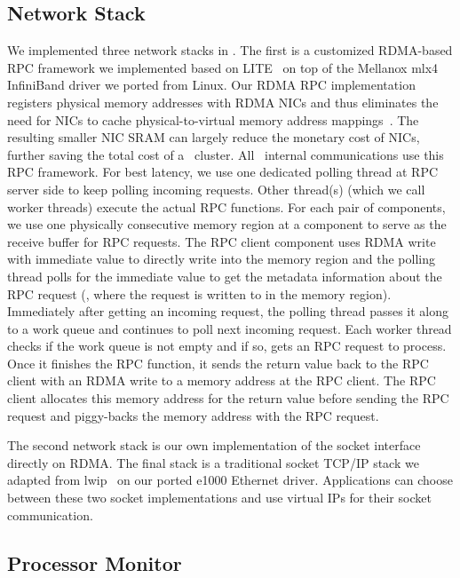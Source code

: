 \documentclass[10pt,times,twocolumn]{z2-article}
\begin{document}
{{{{{{{\subsection{Network Stack}
We implemented three network stacks in \lego.
The first is a customized RDMA-based RPC framework we implemented based on LITE~\cite{Tsai17-SOSP}
on top of the Mellanox mlx4 InfiniBand driver we ported from Linux.
Our RDMA RPC implementation registers physical memory addresses with RDMA NICs 
and thus eliminates the need for NICs to cache physical-to-virtual memory address mappings~\cite{Tsai17-SOSP}.
The resulting smaller NIC SRAM can largely reduce the monetary cost of NICs,
further saving the total cost of a \lego\ cluster. %
All \lego\ internal communications use this RPC framework.
For best latency, we use one dedicated polling thread at RPC server side to keep polling incoming requests.
Other thread(s) (which we call worker threads) execute the actual RPC functions. 
For each pair of components, we use one physically consecutive memory region at a component
to serve as the receive buffer for RPC requests. 
The RPC client component uses RDMA write with immediate value to directly write 
into the memory region and the polling thread polls for the immediate value to get the metadata 
information about the RPC request (\eg, where the request is written to in the memory region).
Immediately after getting an incoming request, the polling thread passes it along to a 
work queue and continues to poll next incoming request.
Each worker thread checks if the work queue is not empty and if so, gets an RPC request 
to process. Once it finishes the RPC function, it sends the return value back to the RPC client 
with an RDMA write to a memory address at the RPC client.
The RPC client allocates this memory address for the return value before sending the RPC request
and piggy-backs the memory address with the RPC request.

The second network stack is our own implementation of the socket interface directly on RDMA.
The final stack is a traditional socket TCP/IP stack we adapted from lwip~\cite{lwip} 
on our ported e1000 Ethernet driver.
Applications can choose between these two socket implementations 
and use virtual IPs for their socket communication.

\subsection{Processor Monitor}
\label{sec:procimpl}

}}}}}}}
\end{document}
